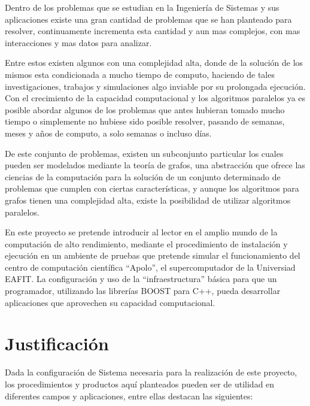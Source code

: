 Dentro de los problemas que se estudian en la Ingeniería de Sistemas y sus aplicaciones existe una gran cantidad de problemas que se han planteado para resolver, continuamente incrementa esta cantidad y  aun mas complejos, con mas interacciones y mas datos para analizar. 

Entre estos existen algunos con una complejidad alta, donde de la solución de los mismos esta condicionada a mucho tiempo de computo, haciendo de tales investigaciones, trabajos y simulaciones algo inviable por su prolongada ejecución. Con el crecimiento de la capacidad computacional y los algoritmos paralelos ya es posible abordar algunos de los problemas que antes hubieran tomado mucho tiempo o simplemente no hubiese sido posible resolver, pasando de semanas, meses y años de computo, a solo semanas o incluso días.  

De este conjunto de problemas, existen un subconjunto particular los cuales pueden ser modelados mediante la teoría de grafos, una  abstracción  que ofrece las ciencias de la computación para la solución de un conjunto determinado de problemas que cumplen con ciertas características, y aunque los algoritmos para grafos tienen una complejidad alta, existe la posibilidad de utilizar algoritmos paralelos.

En este proyecto se pretende introducir al lector en el amplio mundo de la computación de alto rendimiento, mediante el procedimiento de instalación y ejecución en un ambiente de pruebas que pretende simular el funcionamiento del centro de computación científica ``Apolo'', el supercomputador de la Universiad EAFIT. La configuración y uso de la ``infraestructura'' básica para que un programador, utilizando las librerías BOOST para C++, pueda desarrollar aplicaciones que aprovechen su capacidad computacional. 

\section{Justificación}

Dada la configuración de Sistema necesaria para la realización de este proyecto, los procedimientos y productos aquí planteados pueden ser de utilidad en diferentes campos y aplicaciones, entre ellas destacan las siguientes:  

